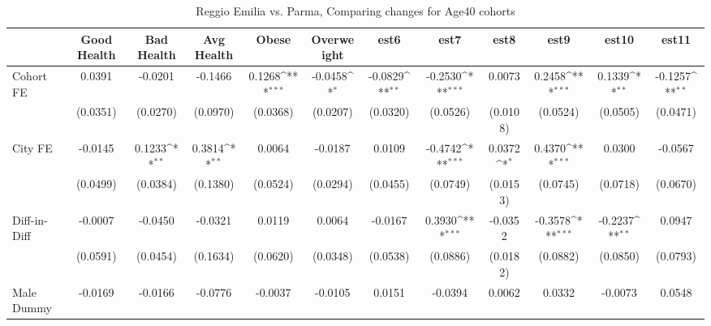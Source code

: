 \begin{table}[htbp]\centering
\def\sym#1{\ifmmode^{#1}\else\(^{#1}\)\fi}
\caption{Reggio Emilia vs. Parma, Comparing changes for Age40 cohorts}
\begin{tabular}{l*{11}{c}}
\toprule
            &\multicolumn{1}{c}{Good Health}&\multicolumn{1}{c}{Bad Health}&\multicolumn{1}{c}{Avg Health}&\multicolumn{1}{c}{Obese}&\multicolumn{1}{c}{Overweight}&\multicolumn{1}{c}{est6}&\multicolumn{1}{c}{est7}&\multicolumn{1}{c}{est8}&\multicolumn{1}{c}{est9}&\multicolumn{1}{c}{est10}&\multicolumn{1}{c}{est11}\\
\midrule
Cohort FE   &      0.0391         &     -0.0201         &     -0.1466         &      0.1268\sym{***}&     -0.0458\sym{*}  &     -0.0829\sym{**} &     -0.2530\sym{***}&      0.0073         &      0.2458\sym{***}&      0.1339\sym{**} &     -0.1257\sym{**} \\
            &    (0.0351)         &    (0.0270)         &    (0.0970)         &    (0.0368)         &    (0.0207)         &    (0.0320)         &    (0.0526)         &    (0.0108)         &    (0.0524)         &    (0.0505)         &    (0.0471)         \\
\addlinespace
City FE     &     -0.0145         &      0.1233\sym{**} &      0.3814\sym{**} &      0.0064         &     -0.0187         &      0.0109         &     -0.4742\sym{***}&      0.0372\sym{*}  &      0.4370\sym{***}&      0.0300         &     -0.0567         \\
            &    (0.0499)         &    (0.0384)         &    (0.1380)         &    (0.0524)         &    (0.0294)         &    (0.0455)         &    (0.0749)         &    (0.0153)         &    (0.0745)         &    (0.0718)         &    (0.0670)         \\
\addlinespace
Diff-in-Diff&     -0.0007         &     -0.0450         &     -0.0321         &      0.0119         &      0.0064         &     -0.0167         &      0.3930\sym{***}&     -0.0352         &     -0.3578\sym{***}&     -0.2237\sym{**} &      0.0947         \\
            &    (0.0591)         &    (0.0454)         &    (0.1634)         &    (0.0620)         &    (0.0348)         &    (0.0538)         &    (0.0886)         &    (0.0182)         &    (0.0882)         &    (0.0850)         &    (0.0793)         \\
\addlinespace
Male Dummy  &     -0.0169         &     -0.0166         &     -0.0776         &     -0.0037         &     -0.0105         &      0.0151         &     -0.0394         &      0.0062         &      0.0332         &     -0.0073         &      0.0548         \\

\end{tabular}
\end{table}
